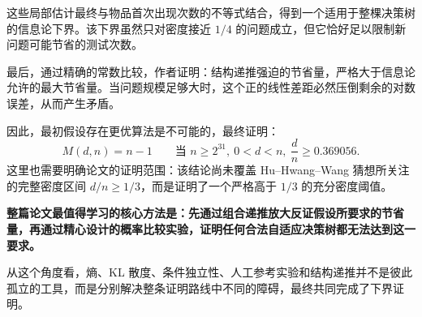 \documentclass[UTF8,11pt]{ctexart}
\begin{document}
这些局部估计最终与物品首次出现次数的不等式结合，得到一个适用于整棵决策树的信息论下界。该下界虽然只对密度接近 $1/4$ 的问题成立，但它恰好足以限制新问题可能节省的测试次数。

最后，通过精确的常数比较，作者证明：结构递推强迫的节省量，严格大于信息论允许的最大节省量。当问题规模足够大时，这个正的线性差距必然压倒剩余的对数误差，从而产生矛盾。

因此，最初假设存在更优算法是不可能的，最终证明：
\[
\boxed{M(d,n)=n-1\qquad\text{当 }n\ge2^{31},\ 0<d<n,\ \frac dn\ge0.369056.}
\]
这里也需要明确论文的证明范围：该结论尚未覆盖 Hu--Hwang--Wang 猜想所关注的完整密度区间 $d/n\ge1/3$，而是证明了一个严格高于 $1/3$ 的充分密度阈值。

\textbf{整篇论文最值得学习的核心方法是：先通过组合递推放大反证假设所要求的节省量，再通过精心设计的概率比较实验，证明任何合法自适应决策树都无法达到这一要求。}

从这个角度看，熵、KL 散度、条件独立性、人工参考实验和结构递推并不是彼此孤立的工具，而是分别解决整条证明路线中不同的障碍，最终共同完成了下界证明。
\end{document}
